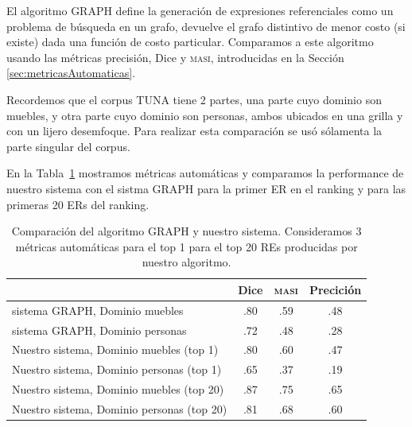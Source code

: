 El algoritmo GRAPH define la generaci\'on de expresiones referenciales como un problema de b\'usqueda en un grafo, devuelve el grafo distintivo de menor costo (si existe) dada una funci\'on de costo particular. Comparamos a este algoritmo usando las m\'etricas precisi\'on, Dice y \textsc {masi}, introducidas en la Secci\'on \ref{sec:metricasAutomaticas}. 

Recordemos que el corpus TUNA tiene 2 partes, una parte cuyo dominio son muebles, y otra parte cuyo dominio son personas, ambos ubicados en una grilla y con un lijero desemfoque. Para realizar esta comparaci\'on se us\'o s\'olamenta la parte singular del corpus.

En la Tabla~\ref{Tabla_sis_1_20} mostramos m\'etricas autom\'aticas y comparamos la performance de nuestro sistema con el sistma GRAPH para la primer ER en el ranking y para las primeras 20 ERs del ranking.

\begin{table}[h!]
\begin{center}
\begin{tabular}{|l|c|c|c|}
\hline
	 	& 	Dice		&	\textsc{masi}	&	Precici\'on		\\
\hline
sistema GRAPH, Dominio muebles	& 	.80 		&	.59	&	.48		 	\\
sistema GRAPH, Dominio personas 	& 	.72		&	.48	&	.28			\\
\hline
Nuestro sistema, Dominio muebles (top 1)	&	.80		&	.60	&	.47		\\
Nuestro sistema, Dominio personas (top 1)	&	.65		&	.37	&	.19		\\
\hline
Nuestro sistema, Dominio muebles (top 20)&	.87		&	.75  	&	.65		\\
Nuestro sistema, Dominio personas (top 20)   &	.81		&	.68	&	.60		\\
\hline
\end{tabular}
\caption{Comparaci\'on del algoritmo GRAPH y nuestro sistema. Consideramos 3 m\'etricas autom\'aticas para el top 1 para el top 20 REs producidas por nuestro algoritmo.}
\vspace*{-.5cm}
\label{Tabla_sis_1_20}
\end{center}
\end{table}

